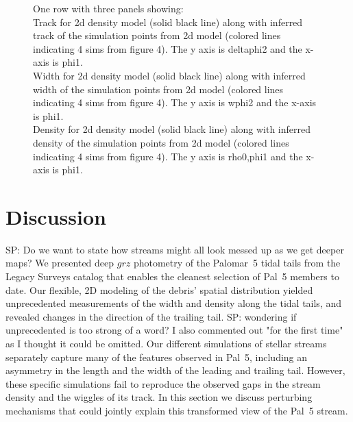 \documentclass[twocolumn]{aastex62}
\newcommand{\ab}[1]{{\color{teal} AB: #1}}
\newcommand{\sa}[1]{{\color{magenta} SP: #1}}
\begin{document}
\begin{figure}
\caption{One row with three panels showing:\\
Track for 2d density model (solid black line) along with inferred track of the simulation points from 2d model (colored lines indicating 4 sims from figure 4). The y axis is deltaphi2 and the x-axis is phi1.\\
Width for 2d density model (solid black line) along with inferred width of the simulation points from 2d model (colored lines indicating 4 sims from figure 4). The y axis is wphi2 and the x-axis is phi1.\\
Density for 2d density model (solid black line) along with inferred density of the simulation points from 2d model (colored lines indicating 4 sims from figure 4). The y axis is rho0,phi1 and the x-axis is phi1.
}
\label{fig:model-sim-compare}
\end{figure}





\section{Discussion}
\label{sec:discussion}
\sa{Do we want to state how streams might all look messed up as we get deeper maps?  }
We presented deep $grz$ photometry of the Palomar~5 tidal tails from the Legacy Surveys catalog that enables the cleanest selection of Pal~5 members to date.
Our flexible, 2D modeling of the debris' spatial distribution yielded unprecedented measurements of the width and density along the tidal tails, and revealed 
changes in the direction of the trailing tail. \sa{wondering if unprecedented is too strong of a word? I also commented out "for the first time" as I thought it could be omitted.}
Our different simulations
of stellar streams
separately capture many of the features observed in Pal~5, including an asymmetry in the length and the width of the leading and trailing tail.
However, these specific simulations fail to reproduce the observed gaps in the stream density and the wiggles of its track.
In this section we discuss perturbing mechanisms that could jointly explain this transformed view of the Pal~5 stream.
\end{document}
